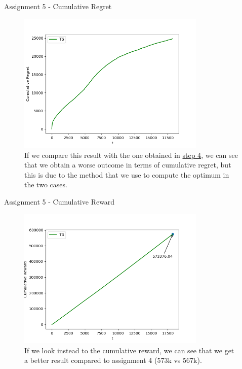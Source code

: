 \documentclass[11pt]{beamer}
\begin{document}
\begin{frame}{Assignment 5 - Cumulative Regret}
\begin{figure}[hbtp]
\centering
\includegraphics[width=0.8\textwidth]{images/assignment_5_cum_regret.png}
\caption{If we compare this result with the one obtained in \hyperlink{page.37}{step 4}, we can see that we obtain a worse outcome in terms of cumulative regret, but this is due to the method that we use to compute the optimum in the two cases.}
\end{figure}
\end{frame}

\begin{frame}{Assignment 5 - Cumulative Reward}
\begin{figure}[hbtp]
\centering
\includegraphics[width=0.8\textwidth]{images/assignment_5_reward.png}
\caption{If we look instead to the cumulative reward, we can see that we get a better result compared to assignment 4 (573k vs 567k). }
\end{figure}
\end{frame}
\end{document}
